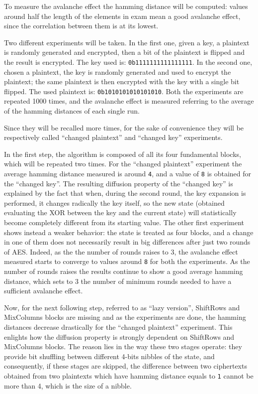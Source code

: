 \documentclass[12pt]{article}
\begin{document}
To measure the avalanche effect the hamming distance will be computed: values around half the length of the elements in exam mean a good avalanche effect, since the correlation between them is at its lowest.

Two different experiments will be taken.
In the first one, given a key, a plaintext is randomly generated and encrypted, then a bit of the plaintext is flipped and the result is encrypted. The key used is: \verb|0b1111111111111111|.
In the second one, chosen a plaintext, the key is randomly generated and used to encrypt the plaintext; the same plaintext is then encrypted with the key with a single bit flipped. The used plaintext is: \verb|0b1010101010101010|.
Both the experiments are repeated 1000 times, and the avalanche effect is measured referring to the average of the hamming distances of each single run.

Since they will be recalled more times, for the sake of convenience they will be respectively called ``changed plaintext'' and ``changed key'' experiments.

In the first step, the algorithm is composed of all its four fundamental blocks, which will be repeated two times. 
For the ``changed plaintext'' experiment the average hamming distance measured is around \verb|4|, and a value of \verb|8| is obtained for the ``changed key''.
The resulting diffusion property of the ``changed key'' is explained by the fact that when, during the second round, the key expansion is performed, it changes radically the key itself, so the new state (obtained evaluating the XOR between the key and the current state) will statistically become completely different from its starting value.
The other first experiment shows instead a weaker behavior: the state is treated as four blocks, and a change in one of them does not necessarily result in big differences after just two rounds of AES\@. 
Indeed, as the the number of rounds raises to 3, the avalanche effect measured starts to converge to values around \verb|8| for both the experiments.
As the number of rounds raises the results continue to show a good average hamming distance, which sets to 3 the number of minimum rounds needed to have a sufficient avalanche effect.

Now, for the next following step, referred to as ``lazy version'', ShiftRows and MixColumns blocks are missing and as the experiments are done, the hamming distances decrease drastically for the ``changed plaintext'' experiment. This enlights how the diffusion property is strongly dependent on ShiftRows and MixColumns blocks. The reason lies in the way these two stages operate: they provide bit shuffling between different 4-bits nibbles of the state, and consequently, if these stages are skipped, the difference between two ciphertexts obtained from two plaintexts which have hamming distance equals to \verb|1| cannot be more than 4, which is the size of a nibble.
\end{document}
